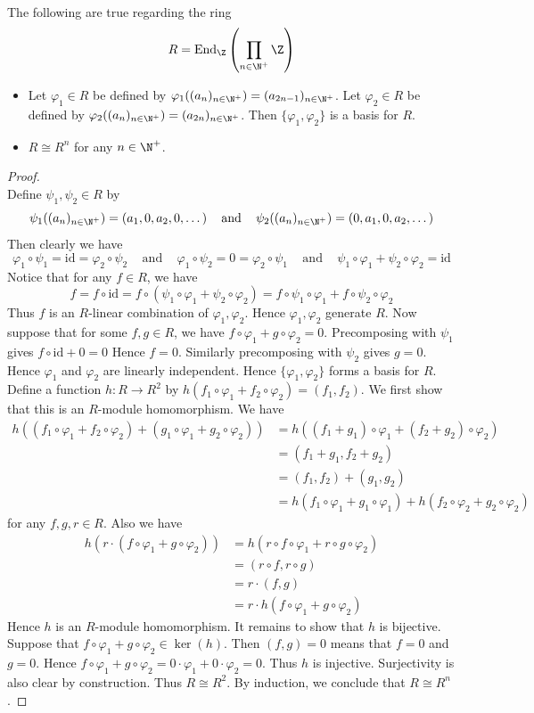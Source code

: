 \documentclass[a4paper]{article}
\begin{document}
\begin{eg}{}{}\\
The following are true regarding the ring $$R=\text{End}_\Z\left(\prod_{n\in\N^+}\Z\right)$$
\begin{itemize}
\item Let $\varphi_1\in R$ be defined by $\varphi_1((a_n)_{n\in\N^+})=(a_{2n-1})_{n\in\N^+}$. Let $\varphi_2\in R$ be defined by $\varphi_2((a_n)_{n\in\N^+})=(a_{2n})_{n\in\N^+}$. Then $\{\varphi_1,\varphi_2\}$ is a basis for $R$. 
\item $R\cong R^n$ for any $n\in\N^+$. 
\end{itemize}
\begin{proof}\\
Define $\psi_1,\psi_2\in R$ by $$\psi_1((a_n)_{n\in\N^+})=(a_1,0,a_2,0,\dots)\;\;\;\text{ and }\;\;\;\psi_2((a_n)_{n\in\N^+})=(0,a_1,0,a_2,\dots)$$ Then clearly we have $$\varphi_1\circ\psi_1=\text{id}=\varphi_2\circ\psi_2\;\;\;\text{ and }\;\;\;\varphi_1\circ\psi_2=0=\varphi_2\circ\psi_1\;\;\;\text{ and }\;\;\;\psi_1\circ\varphi_1+\psi_2\circ\varphi_2=\text{id}$$ Notice that for any $f\in R$, we have $$f=f\circ\text{id}=f\circ(\psi_1\circ\varphi_1+\psi_2\circ\varphi_2)=f\circ\psi_1\circ\varphi_1+f\circ\psi_2\circ\varphi_2$$ Thus $f$ is an $R$-linear combination of $\varphi_1,\varphi_2$. Hence $\varphi_1,\varphi_2$ generate $R$. Now suppose that for some $f,g\in R$, we have $f\circ\varphi_1+g\circ\varphi_2=0$. Precomposing with $\psi_1$ gives $f\circ\text{id}+0=0$ Hence $f=0$. Similarly precomposing with $\psi_2$ gives $g=0$. Hence $\varphi_1$ and $\varphi_2$ are linearly independent. Hence $\{\varphi_1,\varphi_2\}$ forms a basis for $R$. \\

Define a function $h:R\to R^2$ by $h(f_1\circ\varphi_1+f_2\circ\varphi_2)=(f_1,f_2)$. We first show that this is an $R$-module homomorphism. We have 
\begin{align*}
h((f_1\circ\varphi_1+f_2\circ\varphi_2)+(g_1\circ\varphi_1+g_2\circ\varphi_2))&=h((f_1+g_1)\circ\varphi_1+(f_2+g_2)\circ\varphi_2)\\
&=(f_1+g_1,f_2+g_2)\\
&=(f_1,f_2)+(g_1,g_2)\\
&=h(f_1\circ\varphi_1+g_1\circ\varphi_1)+h(f_2\circ\varphi_2+g_2\circ\varphi_2)
\end{align*}
for any $f,g,r\in R$. Also we have 
\begin{align*}
h(r\cdot(f\circ\varphi_1+g\circ\varphi_2))&=h(r\circ f\circ\varphi_1+r\circ g\circ\varphi_2)\\
&=(r\circ f,r\circ g)\\
&=r\cdot(f,g)\\
&=r\cdot h(f\circ\varphi_1+g\circ\varphi_2)
\end{align*}
Hence $h$ is an $R$-module homomorphism. It remains to show that $h$ is bijective. Suppose that $f\circ\varphi_1+g\circ\varphi_2\in\ker(h)$. Then $(f,g)=0$ means that $f=0$ and $g=0$. Hence $f\circ\varphi_1+g\circ\varphi_2=0\cdot\varphi_1+0\cdot\varphi_2=0$. Thus $h$ is injective. Surjectivity is also clear by construction. Thus $R\cong R^2$. By induction, we conclude that $R\cong R^n$. 
\end{proof}
\end{eg}
\end{document}
